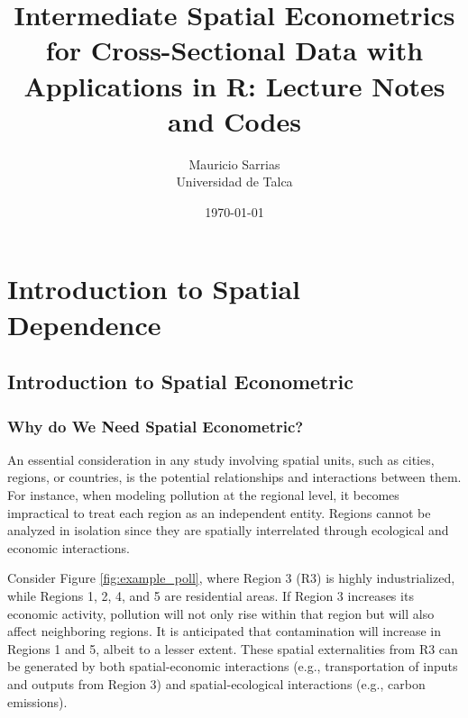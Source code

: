 \documentclass[english,12pt]{book}\usepackage[]{graphicx}\usepackage[]{xcolor}
\begin{document}
\frontmatter 
\title{Intermediate Spatial Econometrics for Cross-Sectional Data with Applications in R: Lecture Notes and Codes}
\author{Mauricio Sarrias\\
Universidad de Talca}
\date{\today}
\maketitle
\tableofcontents

\listoffigures
\listoftables



\mainmatter

\part{Introduction to Spatial Dependence}


\chapter{Introduction to Spatial Econometric}\label{chapater:Introduction}


\section{Why do We Need Spatial Econometric?}\label{sec:why_se}

An essential consideration in any study involving spatial units, such as cities, regions, or countries, is the potential relationships and interactions between them. For instance, when modeling pollution at the regional level, it becomes impractical to treat each region as an independent entity. Regions cannot be analyzed in isolation since they are spatially interrelated through ecological and economic interactions.

Consider Figure \ref{fig:example_poll}, where Region 3 (R3) is highly industrialized, while Regions 1, 2, 4, and 5 are residential areas. If Region 3 increases its economic activity, pollution will not only rise within that region but will also affect neighboring regions. It is anticipated that contamination will increase in Regions 1 and 5, albeit to a lesser extent. These spatial externalities from R3 can be generated by both spatial-economic interactions (e.g., transportation of inputs and outputs from Region 3) and spatial-ecological interactions (e.g., carbon emissions).
\end{document}
